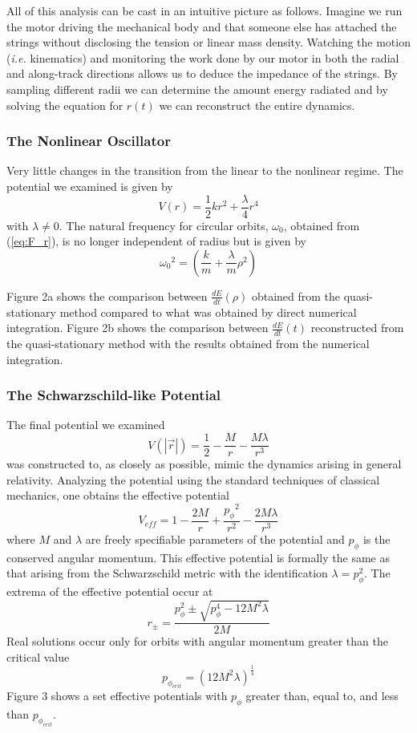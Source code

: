 All of this analysis can be cast in an intuitive picture as 
follows.  
Imagine we run the motor driving the mechanical body and that 
someone else has attached the strings without disclosing the tension 
or linear mass density.  
Watching the motion (\emph{i.e.} kinematics) and monitoring the 
work done by our motor in both the radial and along-track 
directions allows us to deduce the impedance of the strings.  
By sampling different radii we can determine the amount energy 
radiated and by solving the equation for $r(t)$ we can 
reconstruct the entire dynamics.

\subsubsection{The Nonlinear Oscillator}

Very little changes in the transition from the linear to the nonlinear regime.
The potential we examined is given by 
\[
  V(r) = \frac{1}{2}k r^2 + \frac{\lambda}{4} r^4
\]
with $\lambda \ne 0$.
The natural frequency for circular orbits, $\omega_0$, obtained
from (\ref{eq:F_r}), is no longer independent of radius but is 
given by
\[ 
{\omega_{0}}^2 = \left( \frac{k}{m} + \frac{\lambda}{m} \rho^2 \right)
\]

Figure 2a shows the comparison between $\frac{d E}{d t}(\rho)$ obtained
from the quasi-stationary method compared to what was obtained by direct 
numerical integration.  Figure 2b shows the comparison between 
$\frac{d E}{d t}(t)$ reconstructed from the quasi-stationary method
with the results obtained from the numerical integration.

\subsubsection{The Schwarzschild-like Potential}

The final potential we examined
\[
	V(|\vec r|) = \frac{1}{2} - \frac{M}{r} - \frac{M \lambda}{r^3}
\]
was constructed to, as closely as possible, mimic the dynamics
arising in general relativity.  Analyzing the potential using the
standard techniques of classical mechanics, one obtains the 
effective potential  
\[
  V_{eff} = 1 - \frac{2 M}{r} + \frac{ {p_{\phi}}^2}{r^2} 
              - \frac{2 M \lambda}{r^3}
\]
where $M$ and $\lambda$ are freely specifiable parameters of the 
potential and $p_{\phi}$ is the conserved angular momentum.
This effective potential is formally the same as that arising 
from the Schwarzschild metric with the identification
$\lambda = p_{\phi}^2$. 
The extrema of the effective potential occur at
\[
  r_{\pm} = \frac{ p_{\phi}^2 \pm \sqrt{ p_{\phi}^4 - 
                                         12 M^2 \lambda
									   } 
				 }{2M}
\]
Real solutions occur only for orbits with angular momentum greater 
than the critical value
\[
  p_{\phi_{crit}} = \left( 12 M^2 \lambda \right)^{\frac{1}{4}}
\]
Figure 3 shows a set effective potentials with $p_{\phi}$ greater than, 
equal to, and less than $p_{\phi_{crit}}$.

